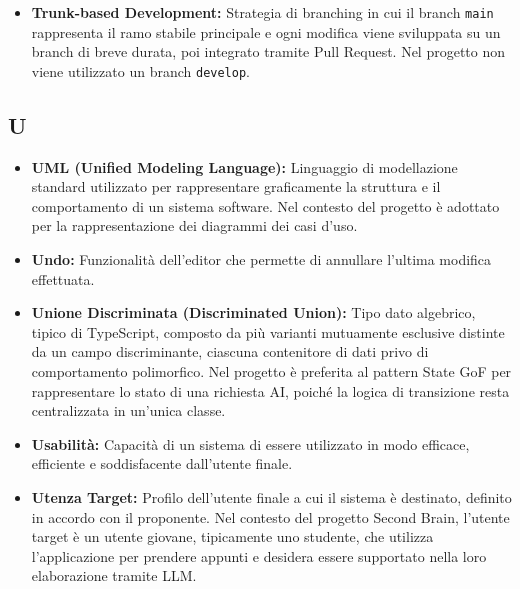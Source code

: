 \begin{itemize}[leftmargin=*]
            convertire il testo presente nell'editor in una lingua diversa
            tramite invocazione di un LLM. Le lingue supportate sono Inglese,
            Francese e Spagnolo come requisito obbligatorio; il Tedesco è
            previsto come estensione facoltativa. Sono escluse le lingue con
            alfabeti non latini.
      \item \textbf{Trunk-based Development:} Strategia di branching in cui il branch
      \texttt{main} rappresenta il ramo stabile principale e ogni modifica viene
      sviluppata su un branch di breve durata, poi integrato tramite Pull Request.
      Nel progetto non viene utilizzato un branch \texttt{develop}.
\end{itemize}
 
{}
\subsection*{U}
\begin{itemize}[leftmargin=*]
      \item \textbf{UML (Unified Modeling Language):} Linguaggio di modellazione
      standard utilizzato per rappresentare graficamente la struttura e il
      comportamento di un sistema software. Nel contesto del progetto è
      adottato per la rappresentazione dei diagrammi dei casi d'uso.
      \item \textbf{Undo:} Funzionalità dell'editor che permette di annullare l'ultima modifica effettuata.
      \item \textbf{Unione Discriminata (Discriminated Union):} Tipo dato algebrico, tipico di TypeScript, composto da più varianti mutuamente esclusive distinte da un campo discriminante, ciascuna contenitore di dati privo di comportamento polimorfico. Nel progetto è preferita al pattern State GoF per rappresentare lo stato di una richiesta AI, poiché la logica di transizione resta centralizzata in un'unica classe.
      \item \textbf{Usabilità:} Capacità di un sistema di essere utilizzato in modo efficace, efficiente e soddisfacente dall'utente finale.
      \item \textbf{Utenza Target:} Profilo dell'utente finale a cui il sistema
      è destinato, definito in accordo con il proponente. Nel contesto del
      progetto Second Brain, l'utente target è un utente giovane,
      tipicamente uno studente, che utilizza l'applicazione per prendere
      appunti e desidera essere supportato nella loro elaborazione tramite
      LLM.
\end{itemize}
 

